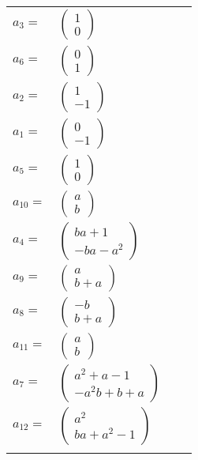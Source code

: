 \documentclass[1p]{elsarticle_modified}
\theoremstyle{definition}
\begin{document}
\begin{tabular}{m{7pt} m{180pt} m{7pt} m{180pt} }
\flushright $a_{3}=$&$\begin{pmatrix}1\\0\end{pmatrix}$ \\
\flushright $a_{6}=$&$\begin{pmatrix}0\\1\end{pmatrix}$ \\
\flushright $a_{2}=$&$\begin{pmatrix}1\\-1\end{pmatrix}$ \\
\flushright $a_{1}=$&$\begin{pmatrix}0\\-1\end{pmatrix}$ \\
\flushright $a_{5}=$&$\begin{pmatrix}1\\0\end{pmatrix}$ \\
\flushright $a_{10}=$&$\begin{pmatrix}a\\b\end{pmatrix}$ \\
\flushright $a_{4}=$&$\begin{pmatrix}b a+1\\- b a- a^2\end{pmatrix}$ \\
\flushright $a_{9}=$&$\begin{pmatrix}a\\b+a\end{pmatrix}$ \\
\flushright $a_{8}=$&$\begin{pmatrix}- b\\b+a\end{pmatrix}$ \\
\flushright $a_{11}=$&$\begin{pmatrix}a\\b\end{pmatrix}$ \\
\flushright $a_{7}=$&$\begin{pmatrix}a^2+a-1\\- a^2 b+b+a\end{pmatrix}$ \\
\flushright $a_{12}=$&$\begin{pmatrix}a^2\\b a+a^2-1\end{pmatrix}$\\&\end{tabular}
\end{document}
